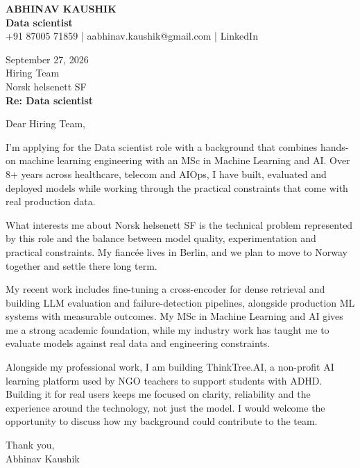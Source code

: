 \documentclass[10pt,a4paper]{article}
\begin{document}
\begin{center}
{\Large\bfseries ABHINAV KAUSHIK}\\[2pt]
{\bfseries Data scientist}\\[2pt]
+91 87005 71859 \quad | \quad aabhinav.kaushik@gmail.com \quad | \quad LinkedIn
\end{center}
\vspace{8pt}
September 27, 2026\\[6pt]
Hiring Team\\
Norsk helsenett SF\\[4pt]
\textbf{Re: Data scientist}

Dear Hiring Team,

I’m applying for the Data scientist role with a background that combines hands-on machine learning engineering with an MSc in Machine Learning and AI. Over 8+ years across healthcare, telecom and AIOps, I have built, evaluated and deployed models while working through the practical constraints that come with real production data.

What interests me about Norsk helsenett SF is the technical problem represented by this role and the balance between model quality, experimentation and practical constraints. My fiancée lives in Berlin, and we plan to move to Norway together and settle there long term.

My recent work includes fine-tuning a cross-encoder for dense retrieval and building LLM evaluation and failure-detection pipelines, alongside production ML systems with measurable outcomes. My MSc in Machine Learning and AI gives me a strong academic foundation, while my industry work has taught me to evaluate models against real data and engineering constraints.

Alongside my professional work, I am building ThinkTree.AI, a non-profit AI learning platform used by NGO teachers to support students with ADHD. Building it for real users keeps me focused on clarity, reliability and the experience around the technology, not just the model. I would welcome the opportunity to discuss how my background could contribute to the team.

Thank you,\\
Abhinav Kaushik
\end{document}

